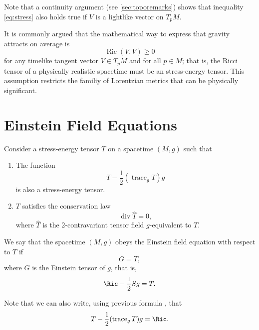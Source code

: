 Note that a continuity argument (see \autoref{sec:toporemarks}) shows that inequality \ref{eq:stress} also holds true if $V$ is a lightlike vector on $T_p M$.

It is commonly argued that the mathematical way to express that gravity attracts on average is
\begin{equation}
	\operatorname{Ric} (V,V) \geq 0
\end{equation}
for any timelike tangent vector $V \in T_p M$ and for all $p \in M$; that is, the Ricci tensor of a physically realistic spacetime must be an stress-energy tensor. This assumption restricts the familiy of Lorentzian metrics that can be physically significant.

\section{Einstein Field Equations}

Consider a stress-energy tensor $T$ on a spacetime $(M,g)$ such that
\begin{enumerate}
	\item The function \begin{equation}
		\label{eq:stressderived}
		T - \frac{1}{2}(\operatorname{trace}_g T) g
	\end{equation} is also a stress-energy tensor.
	\item $T$ satisfies the conservation law \begin{equation}
		\label{eq:div0}
		\operatorname{div} \widehat{T} = 0,
	\end{equation}
	where $\widehat{T}$ is the 2-contravariant tensor field $g$-equivalent to $T$.
\end{enumerate}

We say that the spacetime $(M,g)$ obeys the Einstein field equation with respect to $T$ if 
\begin{equation}
	\label{eq:einstein}
	G  = T,
\end{equation}
where $G$ is the Einstein tensor of $g$, that is,
\begin{equation}
	\label{eq:einstein2}
	\Ric - \frac{1}{2}Sg = T.
\end{equation}

Note that we can also write, using previous formula , that
\begin{equation}
	\label{eq:einstein3}
	T - \frac{1}{2}(\operatorname{trace}_g T)g = \Ric.
\end{equation}

